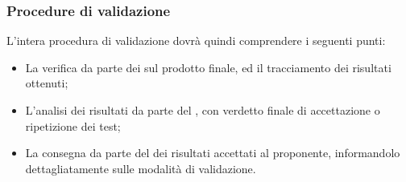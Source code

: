 \subsubsection{Procedure di validazione}
L'intera procedura di validazione dovrà quindi comprendere i seguenti punti:
\begin{itemize}
	\item La verifica da parte dei \vers{} sul prodotto finale, ed il tracciamento dei risultati ottenuti;
	\item L'analisi dei risultati da parte del \RdP{}, con verdetto finale di accettazione o ripetizione dei test;
	\item La consegna da parte del \RdP{} dei risultati accettati al proponente, informandolo dettagliatamente sulle modalità di validazione.
\end{itemize}
\begin{comment}
	\paragraph{Strumenti per l'analisi dinamica}
	\begin{itemize}
		\item 
		\emph{\textbf{\emph{\textcolor{red}{Karma}}}}\ped{G}\footnote{\href{https://karma-runner.github.io/2.0/index.html}{https://karma-runner.github.io/2.0/index.html}}
		~\\È uno strumento per effettuare test di unità sugli script realizzati, installabile come modulo per \emph{Node.js}\ped{G};
		\item 
		\emph{\textbf{\emph{\textcolor{red}{Mocha}}}}\ped{G}\footnote{\href{https://mochajs.org/}{https://mochajs.org/}}
		~\\È un framework per l'esecuzione dei test asincroni e in serie di Javascript, scritto Node.js.
	\end{itemize}
\end{comment}
